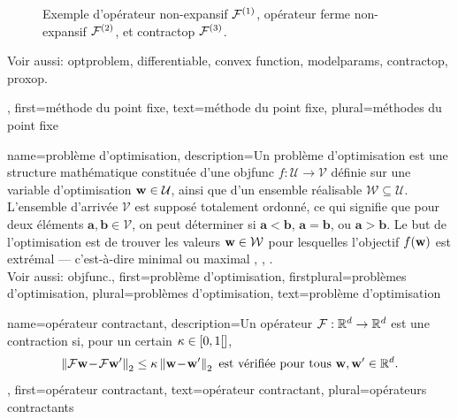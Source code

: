 {{\begin{figure}[H]
\begin{center}
			\end{center} 
			\caption{Exemple d'opérateur non-expansif $\mathcal{F}^{(1)}$, opérateur ferme non-expansif $\mathcal{F}^{(2)}$, et \gls{contractop} $\mathcal{F}^{(3)}$. \label{fig_examples_nonexp_dict}}
		\end{figure}
		Voir aussi: \gls{optproblem}, \gls{differentiable}, \gls{convex} \gls{function}, \gls{modelparams}, 
		\gls{contractop}, \gls{proxop}.},
	first={méthode du point fixe},
	text={méthode du point fixe},
	plural={méthodes du point fixe}
}

{name={problème d’optimisation}, 
	description={Un problème d’optimisation est une structure mathématique 
		constituée d’une \gls{objfunc} $f: \mathcal{U} \rightarrow \mathcal{V}$ 
		définie sur une variable d’optimisation ${\bf w} \in \mathcal{U}$, ainsi que d’un 
		ensemble réalisable $\mathcal{W} \subseteq \mathcal{U}$. L'ensemble d'arrivée $\mathcal{V}$ est 
		supposé totalement ordonné, ce qui signifie que pour deux éléments $\mathbf{a}, \mathbf{b} \in \mathcal{V}$, 
		on peut déterminer si $\mathbf{a} < \mathbf{b}$, $\mathbf{a} = \mathbf{b}$, 
		ou $\mathbf{a} > \mathbf{b}$. Le but de l’optimisation est de trouver les valeurs ${\bf w} \in \mathcal{W}$ 
		pour lesquelles l’objectif $f({\bf w})$ est extrémal — c’est-à-dire minimal ou maximal \cite{BoydConvexBook}, \cite{BertsekasNonLinProgr}, \cite{nesterov04}.
		\\
		Voir aussi: \gls{objfunc}.},
	first={problème d’optimisation},
	firstplural={problèmes d’optimisation}, 
	plural={problèmes d’optimisation}, 
	text={problème d’optimisation}
}

{name={opérateur contractant},
	description={Un opérateur $\mathcal{F}: \mathbb{R}^{d} \rightarrow \mathbb{R}^{d}$
		est une contraction si, pour un certain $\kappa \in [0,1[]$,
		\begin{equation} 
			\nonumber
			\left\Vert { \mathcal{F}{\bf w}\!-\!\mathcal{F}{\bf w}'} \right\Vert_{2}  \leq  \kappa	\left\Vert {{\bf w}\!-\!{\bf w}'} \right\Vert_{2} \mbox{ est vérifiée pour tous } {\bf w},{\bf w}' \in \mathbb{R}^{d}.
		\end{equation}
	},
	first={opérateur contractant},
	text={opérateur contractant}, 
	plural={opérateurs contractants}
}

